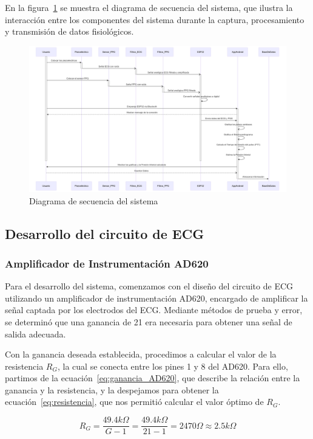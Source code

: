     En la figura~\ref{fig:Diagrama_Secuencia} se muestra el diagrama de secuencia del sistema, que ilustra la interacción entre los componentes del sistema durante la captura, procesamiento y transmisión de datos fisiológicos.

    \begin{figure}[H]
        \centering
        \includegraphics[width=1\textwidth]{img/Desarrollo/diagrama_secuencia.png}
        \caption{Diagrama de secuencia del sistema}
        \label{fig:Diagrama_Secuencia}
    \end{figure}

    \subsection{Desarrollo del circuito de ECG}
        \subsubsection{Amplificador de Instrumentación AD620}
        Para el desarrollo del sistema, comenzamos con el diseño del circuito de ECG utilizando un amplificador de instrumentación AD620, encargado de amplificar la señal captada por los electrodos del ECG. Mediante métodos de prueba y error, se determinó que una ganancia de 21 era necesaria para obtener una señal de salida adecuada.

        Con la ganancia deseada establecida, procedimos a calcular el valor de la resistencia $R_G$, la cual se conecta entre los pines 1 y 8 del AD620. Para ello, partimos de la ecuación~\ref{eq:ganancia_AD620}, que describe la relación entre la ganancia y la resistencia, y la despejamos para obtener la ecuación~\ref{eq:resistencia}, que nos permitió calcular el valor óptimo de $R_G$.

        \begin{equation}
            \label{eq:resistencia}
            R_G = \frac{49.4 k\Omega}{G - 1} = \frac{49.4 k\Omega}{21 - 1} = 2470 \Omega \approx 2.5 k\Omega
        \end{equation}

